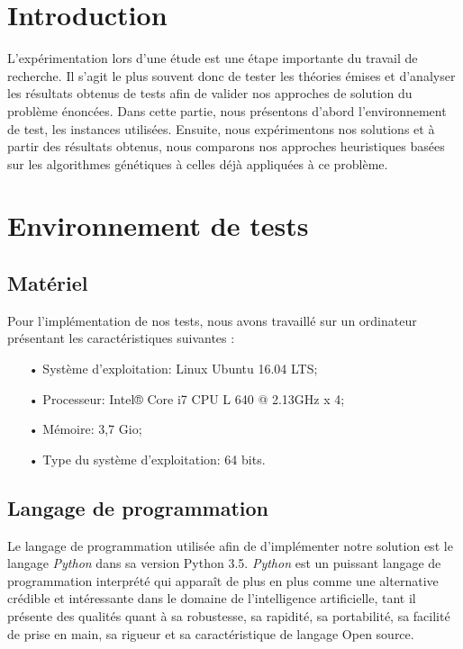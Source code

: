 \documentclass[12pt,a4paper]{article}
\begin{document}
		\section*{Introduction}
		L'expérimentation lors d'une étude est une étape importante du travail de recherche. Il s'agit le plus souvent donc de tester les théories émises et d'analyser les résultats obtenus de tests afin de valider nos approches de solution du problème énoncées. Dans cette partie, nous présentons d'abord l'environnement de test, les instances utilisées. Ensuite, nous expérimentons nos solutions et à partir des résultats obtenus, nous comparons nos approches heuristiques basées sur les algorithmes génétiques à celles déjà appliquées à ce problème.
		
		\section{Environnement de tests} 
		
		\subsection{Matériel}
		Pour l'implémentation de nos tests, nous avons travaillé sur un ordinateur présentant les caractéristiques suivantes :\\
		\begin{itemize}
			\item[•] Système d'exploitation: Linux Ubuntu 16.04 LTS; \\
			\item[•] Processeur: Intel®  Core  i7 CPU L 640 @ 2.13GHz x 4; \\
			\item[•] Mémoire: 3,7 Gio;\\
			\item[•] Type du système d'exploitation: 64 bits.\\
		\end{itemize}
		\subsection{Langage de programmation}
		Le langage de programmation utilisée afin de d'implémenter notre solution est le langage \emph{Python} dans sa version Python 3.5. \emph{Python} est un puissant langage de programmation interprété qui apparaît de plus en plus comme une alternative crédible et intéressante dans le domaine de l'intelligence artificielle, tant il présente des qualités quant à sa robustesse, sa rapidité, sa portabilité, sa facilité de prise en main, sa rigueur et sa caractéristique de langage Open source.  
		
\end{document}
